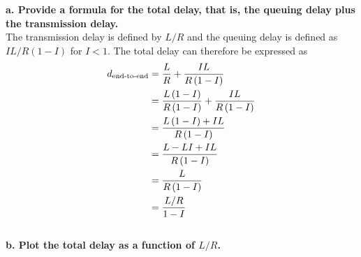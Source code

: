 \textbf{a. Provide a formula for the total delay, that is, the queuing delay plus the transmission delay.} \\
The transmission delay is defined by $L/R$ and the queuing delay is defined as $IL/R (1-I)$ for $I<1$. The total delay can therefore be expressed as
\begin{equation*}
\begin{split}
    d_{\text{end-to-end}} &= \frac{L}{R} + \frac{IL}{R \left (1 - I\right)} \\
    &= \frac{L \left (1 - I\right)}{R \left (1 - I\right)} +  \frac{IL}{R \left (1 - I\right)} \\
    &= \frac{L \left (1 - I\right) + IL}{R \left (1 - I\right)} \\
    &= \frac{L - LI + IL}{R \left (1 - I\right)} \\
    &= \frac{L}{R \left (1 - I\right)} \\
    &= \frac{L/R}{1 - I} \\
\end{split}
\end{equation*}
\\
\textbf{b. Plot the total delay as a function of $L/R$.} \\
\begin{center}
\end{center}

